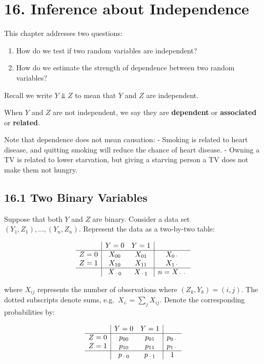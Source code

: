 \section*{16. Inference about Independence}\label{inference-about-independence}

This chapter addresses two questions:

\begin{enumerate}[tightlist,label={\arabic*.}]
\item
  How do we test if two random variables are independent?
\item
  How do we estimate the strength of dependence between two random
  variables?
\end{enumerate}

Recall we write \(Y \text{ ⫫ } Z\) to mean that \(Y\) and \(Z\) are
independent.

When \(Y\) and \(Z\) are not independent, we say they are
\textbf{dependent} or \textbf{associated} or \textbf{related}.

Note that dependence does not mean causation: - Smoking is related to
heart disease, and quitting smoking will reduce the chance of heart
disease. - Owning a TV is related to lower starvation, but giving a
starving person a TV does not make them not hungry.

\subsection*{16.1 Two Binary Variables}\label{two-binary-variables}

Suppose that both \(Y\) and \(Z\) are binary. Consider a data set
\((Y_{1}, Z_{1}), \dots, (Y_{n}, Z_{n})\). Represent the data as a two-by-two
table:

\[
\begin{array}{c|cc|c} 
      & Y = 0  & Y = 1 & \\
\hline
Z = 0 & X_{00} & X_{01} & X_{0\text{·}}\\
Z = 1 & X_{10} & X_{11} & X_{1\text{·}}\\
 \hline
      & X_{\text{·}0} & X_{\text{·}1} & n = X_{\text{··}}
\end{array}
\]

where \(X_{ij}\) represents the number of observations where
\((Z_{k}, Y_{k}) = (i, j)\). The dotted subscripts denote sums,
e.g.~\(X_{i\text{·}} = \sum_{j} X_{ij}\). Denote the corresponding
probabilities by:

\[
\begin{array}{c|cc|c} 
      & Y = 0  & Y = 1 & \\
\hline
Z = 0 & p_{00} & p_{01} & p_{0\text{·}}\\
Z = 1 & p_{10} & p_{11} & p_{1\text{·}}\\
 \hline
      & p_{\text{·}0} & p_{\text{·}1} & 1
\end{array}
\]

